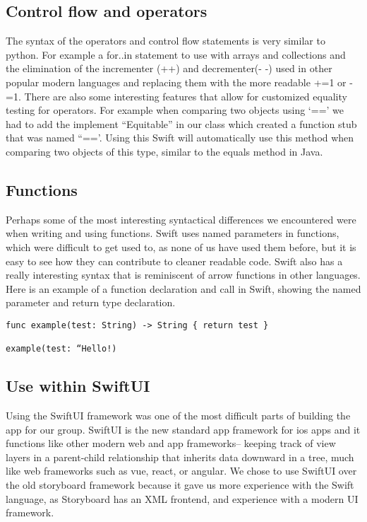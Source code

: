 \documentclass{article}
\begin{document}
\subsection{Control flow and operators}
The syntax of the operators and control flow statements is very similar to python.  For example a for..in statement to use with arrays and collections and the elimination of the incrementer (++) and decrementer(- -) used in other popular modern languages and replacing them with the more readable +=1 or -=1. There are also some interesting features that allow for customized equality testing for operators. For example when comparing two objects using ‘==’ we had to add the implement “Equitable” in our class which created a function stub that was named “==’. Using this Swift will automatically use this method when comparing two objects of this type, similar to the equals method in Java.

\subsection{Functions}
Perhaps some of the most interesting syntactical differences we encountered were when writing and using functions. Swift uses named parameters in functions, which were difficult to get used to, as none of us have used them before, but it is easy to see how they can contribute to cleaner readable code. Swift also has a really interesting syntax that is reminiscent of arrow functions in other languages. Here is an example of a function declaration and call in Swift, showing the named parameter and return type declaration. 

\begin{verbatim} 
func example(test: String) -> String { return test }
 
example(test: “Hello!)
\end{verbatim}

\subsection{Use within SwiftUI}
Using the SwiftUI framework was one of the most difficult parts of building the app for our group. SwiftUI is the new standard app framework for ios apps and it functions like other modern web and app frameworks-- keeping track of view layers in a parent-child relationship that inherits data downward in a tree, much like web frameworks such as vue, react, or angular. We chose to use SwiftUI over the old storyboard framework because it gave us more experience with the Swift language, as Storyboard has an XML frontend, and experience with a modern UI framework. \par
\end{document}
